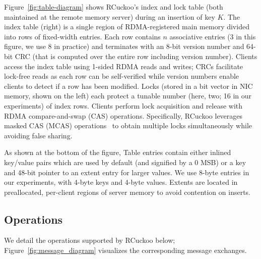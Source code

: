 Figure~\ref{fig:table-diagram} shows RCuckoo's index and lock table
(both maintained at the remote memory server) during an insertion of
key $K$.  The index table (right) is a single region of
RDMA-registered main memory divided into rows of fixed-width entries.
Each row contains $n$ associative entries (3 in this figure, we use 8
in practice) and terminates with an 8-bit version number and 64-bit
CRC (that is computed over the entire row including version number).
Clients access the index table using 1-sided RDMA reads and writes;
CRCs facilitate lock-free reads as each row can be self-verified while
version numbers enable clients to detect if a row has been modified.
Locks (stored in a bit vector in NIC memory, shown on the left) each
protect a tunable number (here, two; 16 in our experiments) of index
rows.  Clients perform lock acquisition and release with RDMA
compare-and-swap (CAS) operations.  Specifically, RCuckoo leverages
masked CAS (MCAS) operations~\cite{rdma-masked-cas,sherman} to obtain
multiple locks simultaneously while avoiding false sharing.


As shown at the bottom of the figure, Table entries contain
either inlined key/value pairs which are used by default
(and signified by a 0 MSB) or a key and 48-bit pointer to an
extent entry for larger values. We use 8-byte entries in our
experiments, with 4-byte keys and 4-byte values.
Extents are located in preallocated, per-client regions of
server memory to avoid contention on inserts.





\subsection{Operations}

We detail the operations supported by RCuckoo below;
Figure~\ref{fig:message_diagram} visualizes the corresponding message
exchanges. 

